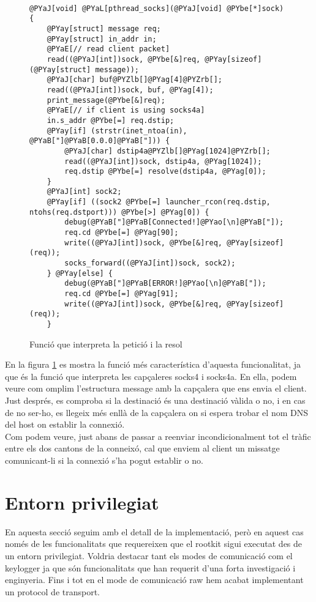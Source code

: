 \begin{figure}[h!]
\begin{Verbatim}[commandchars=@\[\]]

@PYaJ[void] @PYaL[pthread_socks](@PYaJ[void] @PYbe[*]sock) {
    @PYay[struct] message req;
    @PYay[struct] in_addr in;
    @PYaE[// read client packet]
    read((@PYaJ[int])sock, @PYbe[&]req, @PYay[sizeof](@PYay[struct] message));
    @PYaJ[char] buf@PYZlb[]@PYag[4]@PYZrb[];
    read((@PYaJ[int])sock, buf, @PYag[4]);
    print_message(@PYbe[&]req);
    @PYaE[// if client is using socks4a]
    in.s_addr @PYbe[=] req.dstip;
    @PYay[if] (strstr(inet_ntoa(in), @PYaB["]@PYaB[0.0.0]@PYaB["])) {
        @PYaJ[char] dstip4a@PYZlb[]@PYag[1024]@PYZrb[];
        read((@PYaJ[int])sock, dstip4a, @PYag[1024]);
        req.dstip @PYbe[=] resolve(dstip4a, @PYag[0]);
	}
    @PYaJ[int] sock2;
    @PYay[if] ((sock2 @PYbe[=] launcher_rcon(req.dstip, ntohs(req.dstport))) @PYbe[>] @PYag[0]) {
        debug(@PYaB["]@PYaB[Connected!]@PYao[\n]@PYaB["]);
        req.cd @PYbe[=] @PYag[90];
        write((@PYaJ[int])sock, @PYbe[&]req, @PYay[sizeof](req));
        socks_forward((@PYaJ[int])sock, sock2);
    } @PYay[else] {
        debug(@PYaB["]@PYaB[ERROR!]@PYao[\n]@PYaB["]);
        req.cd @PYbe[=] @PYag[91];
        write((@PYaJ[int])sock, @PYbe[&]req, @PYay[sizeof](req));
    }
\end{Verbatim}
    \caption{Funció que interpreta la petició i la resol}
    \label{fig:socksd}
\end{figure}

En la figura \ref{fig:socksd} es mostra la funció més característica d'aquesta funcionalitat, ja que és 
la funció que interpreta les capçaleres socks4 i socks4a. En ella, podem veure com omplim l'estructura
message amb la capçalera que ens envia el client. Just després, es comproba si la destinació és una 
destinació vàlida o no, i en cas de no ser-ho, es llegeix més enllà de la capçalera on si espera trobar 
el nom DNS del host on establir la connexió. \\
Com podem veure, just abans de passar a reenviar incondicionalment tot el tràfic entre els dos cantons
de la conneixó, cal que enviem al client un missatge comunicant-li si la connexió s'ha pogut establir
o no.

\section{Entorn privilegiat}

En aquesta secció seguim amb el detall de la implementació, però en aquest cas només de les funcionalitats
que requereixen que el rootkit sigui executat des de un entorn privilegiat. Voldria
destacar tant els modes de comunicació com el keylogger ja que són funcionalitats que han requerit d'una
forta investigació i enginyeria. Fins i tot en el mode de comunicació raw hem acabat implementant un 
protocol de transport. \\

